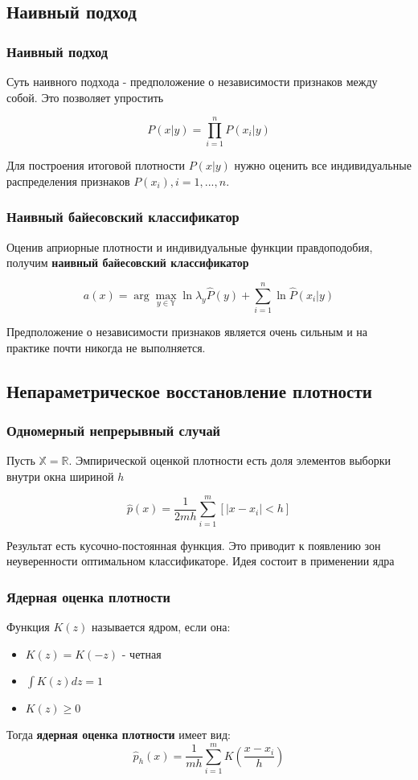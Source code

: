 \documentclass{beamer}
\begin{document}
	\subsection{Наивный подход}
	
	\begin{frame}
		\frametitle{Наивный подход}
		Суть наивного подхода - предположение о независимости признаков между собой.
		Это позволяет упростить
		
		\[
		P(x | y) = \prod_{i=1}^{n} P(x_i | y)
		\]
		
		Для построения итоговой плотности $P(x | y)$ нужно оценить все индивидуальные распределения признаков $P(x_i), i=1, ..., n$.
	\end{frame}
	
	\begin{frame}
		\frametitle{Наивный байесовский классификатор}
		Оценив априорные плотности и индивидуальные функции правдоподобия, получим \textbf{наивный байесовский классификатор}
		
		\[
		a(x) = \arg \max_{y \in \mathbb{Y}} \ln \lambda_{y} \hat{P}(y) + \sum_{i=1}^{n} \ln \hat{P}(x_i | y)
		\]
		
		Предположение о независимости признаков является очень сильным и на практике почти никогда не выполняется. 
	\end{frame}
	
	\subsection{Непараметрическое восстановление плотности}
	
	\begin{frame}
		\frametitle{Одномерный непрерывный случай}
		Пусть $\mathbb{X} = \mathbb{R}$. 
		Эмпирической оценкой плотности есть доля элементов выборки внутри окна шириной $h$
		
		\[
		\hat{p}(x) = \frac{1}{2mh} \sum_{i=1}^{m} [|x - x_i| < h]
		\]
		
		Результат есть кусочно-постоянная функция. Это приводит к появлению зон неуверенности оптимальном классификаторе. Идея состоит в применении ядра
	\end{frame}
	
	\begin{frame}
		\frametitle{Ядерная оценка плотности}
		Функция $K(z)$ называется ядром, если она:
		\begin{itemize}
			\item $K(z) = K(-z)$ - четная
			\item $\int K(z) dz = 1$
			\item $K(z) \ge 0$
		\end{itemize}
		
		\vspace{15pt}
		
		Тогда \textbf{ядерная оценка плотности} имеет вид:
		\[
		\hat{p}_h(x) = \frac{1}{mh} \sum_{i=1}^{m} K\left(\frac{x - x_i}{h} \right)
		\]
		
	\end{frame}
	
\end{document}
